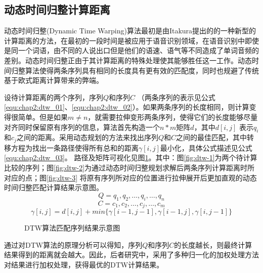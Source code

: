 \subsection{动态时间归整计算距离}
动态时间归整(Dynamic Time Warping)算法最初是由Itakura提出的的一种新型的计算距离的方法，在最初的一段时间是被应用于语音识别领域，在语音识别中即使是同一个词语，由不同的人说出口但是他们的语速、语气等不同造成了单词音频的差别。动态时间归整正由于其计算距离的特殊处理使其能够胜任这一工作。动态时间归整算法使得两条序列具有相同的长度具有更有效的匹配度，同时也规避了传统基于欧式距离计算带来的弊端。
\par 设待计算距离的两个序列，序列$Q$和序列$C$ （两条序列的表示见公式\ref{equ:chap2:dtw_01}、\ref{equ:chap2:dtw_02}）。如果两条序列的长度相同，则计算变得很简单。但是如果$m \neq n$，就需要拉伸变形两条序列，使得它们的长度能够尽量对齐同时保留原有序列的信息，算法首先构造一个$n \ast m$矩阵$d$，其中$d[i,j]$ 表示$q_{i}$ 和$c_{j}$之间的距离。采用动态规划的方法来找出序列$Q$和$C$之间的最佳匹配，其中转移方程为找出一条路径使得所有总和的距离$\gamma[i,j]$最小化，具体公式描述见公式\ref{equ:chap2:dtw_03}。
路径及矩阵可视化见图\ref{fig:2_5}。其中：图\ref{fig:dtw-1}为两个待计算比较的序列；图\ref{fig:dtw-2}为通过动态时间归整规划求解后两条序列计算距离时所对应的点；图\ref{fig:dtw-3} 将原有序列所对应的位置进行拉伸展开后更加直观的动态时间归整匹配计算结果示意图。
\begin{equation}
\label{equ:chap2:dtw_01}
Q=q_{1},q_{2},…,q_{i},…,q_{n}
\end{equation}
\begin{equation}
\label{equ:chap2:dtw_02}
C=c_{1},c_{2},…,c_{j},…,c_{m}
\end{equation}
\begin{equation}
\label{equ:chap2:dtw_03}
\gamma[i,j]=d[i,j]+min\{\gamma[i-1,j-1],\gamma[i-1,j],\gamma[i,j-1]\}
\end{equation}
\begin{figure}[htb]
  \centering%
  \hspace{2em}%
  \hspace{2em}
  \caption{DTW算法匹配序列结果示意图}
  \label{fig:2_5}
\end{figure}
\par 通过对DTW算法的原理分析可以得知，序列$Q$和序列$C$的长度越长，则最终计算结果得到的距离就会越大。因此，后者研究中，采用了多种归一化的加权处理方法对结果进行加权处理，获得最优的DTW计算结果。

